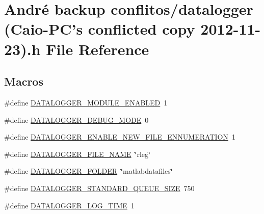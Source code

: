 \hypertarget{datalogger_01_07Caio-PC's_01conflicted_01copy_012012-11-23_08_8h}{\section{André backup conflitos/datalogger (Caio-\/\-P\-C's conflicted copy 2012-\/11-\/23).h File Reference}
\label{datalogger_01_07Caio-PC's_01conflicted_01copy_012012-11-23_08_8h}
}
\subsection*{Macros}
\begin{DoxyCompactItemize}
\item 
\#define \hyperlink{datalogger_01_07Caio-PC's_01conflicted_01copy_012012-11-23_08_8h_ac8cb2695f86c0cbaffc8a955d446bcd8}{D\-A\-T\-A\-L\-O\-G\-G\-E\-R\-\_\-\-M\-O\-D\-U\-L\-E\-\_\-\-E\-N\-A\-B\-L\-E\-D}~1
\item 
\#define \hyperlink{datalogger_01_07Caio-PC's_01conflicted_01copy_012012-11-23_08_8h_ae7698fd72f0fc0920eba24d963a25d5a}{D\-A\-T\-A\-L\-O\-G\-G\-E\-R\-\_\-\-D\-E\-B\-U\-G\-\_\-\-M\-O\-D\-E}~0
\item 
\#define \hyperlink{datalogger_01_07Caio-PC's_01conflicted_01copy_012012-11-23_08_8h_a88583f16b8f2052b817854218252cd3e}{D\-A\-T\-A\-L\-O\-G\-G\-E\-R\-\_\-\-E\-N\-A\-B\-L\-E\-\_\-\-N\-E\-W\-\_\-\-F\-I\-L\-E\-\_\-\-E\-N\-N\-U\-M\-E\-R\-A\-T\-I\-O\-N}~1
\item 
\#define \hyperlink{datalogger_01_07Caio-PC's_01conflicted_01copy_012012-11-23_08_8h_a23bf1fb88a2adab92e7c477d927b241c}{D\-A\-T\-A\-L\-O\-G\-G\-E\-R\-\_\-\-F\-I\-L\-E\-\_\-\-N\-A\-M\-E}~\char`\"{}rleg\char`\"{}
\item 
\#define \hyperlink{datalogger_01_07Caio-PC's_01conflicted_01copy_012012-11-23_08_8h_a29791c024463d251eeab6973a0299e7b}{D\-A\-T\-A\-L\-O\-G\-G\-E\-R\-\_\-\-F\-O\-L\-D\-E\-R}~\char`\"{}matlabdatafiles\char`\"{}
\item 
\#define \hyperlink{datalogger_01_07Caio-PC's_01conflicted_01copy_012012-11-23_08_8h_ac244ccff7e47d7f9e79c1b606664f4fa}{D\-A\-T\-A\-L\-O\-G\-G\-E\-R\-\_\-\-S\-T\-A\-N\-D\-A\-R\-D\-\_\-\-Q\-U\-E\-U\-E\-\_\-\-S\-I\-Z\-E}~750
\item 
\#define \hyperlink{datalogger_01_07Caio-PC's_01conflicted_01copy_012012-11-23_08_8h_a9796dd7063d48a850456a4542c5a5fb5}{D\-A\-T\-A\-L\-O\-G\-G\-E\-R\-\_\-\-L\-O\-G\-\_\-\-T\-I\-M\-E}~1

\end{DoxyCompactItemize}
